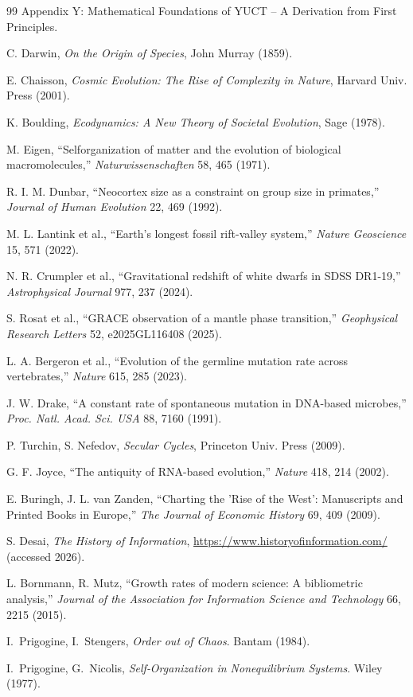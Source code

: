 \documentclass[12pt,a4paper]{article}
\theoremstyle{remark}
\begin{document}
\begin{thebibliography}{99}
		Appendix Y: Mathematical Foundations of YUCT -- A Derivation from First Principles.
		
		C. Darwin, \emph{On the Origin of Species}, John Murray (1859).
		
		E. Chaisson, \emph{Cosmic Evolution: The Rise of Complexity in Nature}, Harvard Univ. Press (2001).
		
		K. Boulding, \emph{Ecodynamics: A New Theory of Societal Evolution}, Sage (1978).
		
		M. Eigen, ``Selforganization of matter and the evolution of biological macromolecules,'' \emph{Naturwissenschaften} 58, 465 (1971).
		
		R. I. M. Dunbar, ``Neocortex size as a constraint on group size in primates,'' \emph{Journal of Human Evolution} 22, 469 (1992).
		
		M. L. Lantink et al., ``Earth's longest fossil rift-valley system,'' \emph{Nature Geoscience} 15, 571 (2022).
		
		N. R. Crumpler et al., ``Gravitational redshift of white dwarfs in SDSS DR1-19,'' \emph{Astrophysical Journal} 977, 237 (2024).
		
		S. Rosat et al., ``GRACE observation of a mantle phase transition,'' \emph{Geophysical Research Letters} 52, e2025GL116408 (2025).
		
		L. A. Bergeron et al., ``Evolution of the germline mutation rate across vertebrates,'' \emph{Nature} 615, 285 (2023).
		
		J. W. Drake, ``A constant rate of spontaneous mutation in DNA-based microbes,'' \textit{Proc. Natl. Acad. Sci. USA} 88, 7160 (1991).
		
		P. Turchin, S. Nefedov, \emph{Secular Cycles}, Princeton Univ. Press (2009).
		
		G. F. Joyce, ``The antiquity of RNA-based evolution,'' \textit{Nature} 418, 214 (2002).
		
		E. Buringh, J. L. van Zanden, ``Charting the 'Rise of the West': Manuscripts and Printed Books in Europe,'' \emph{The Journal of Economic History} 69, 409 (2009).
		
		S. Desai, \emph{The History of Information}, \url{https://www.historyofinformation.com/} (accessed 2026).
		
		L. Bornmann, R. Mutz, ``Growth rates of modern science: A bibliometric analysis,'' \emph{Journal of the Association for Information Science and Technology} 66, 2215 (2015).
		
		 I.~Prigogine, I.~Stengers, \emph{Order out of Chaos}. Bantam (1984).
		
		 I.~Prigogine, G.~Nicolis, \emph{Self‑Organization in Nonequilibrium Systems}. Wiley (1977).
		
	\end{thebibliography}
	
\end{document}
